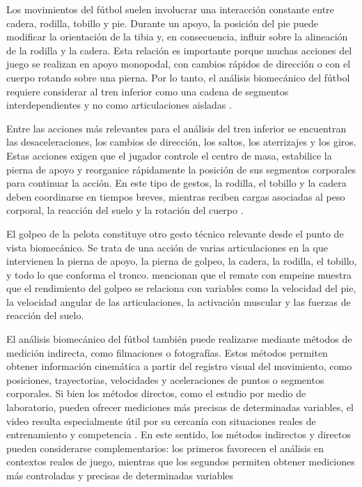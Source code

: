 Los movimientos del fútbol suelen involucrar una interacción constante entre cadera, rodilla,
tobillo y pie. Durante un apoyo, la posición del pie puede modificar la orientación de la tibia
y, en consecuencia, influir sobre la alineación de la rodilla y la cadera. Esta relación es
importante porque muchas acciones del juego se realizan en apoyo monopodal, con cambios rápidos
de dirección o con el cuerpo rotando sobre una pierna. Por lo tanto, el análisis biomecánico del
fútbol requiere considerar al tren inferior como una cadena de segmentos interdependientes y no
como articulaciones aisladas \parencite{SanchezHernandezEtAl2016}.

Entre las acciones más relevantes para el análisis del tren inferior se encuentran las
desaceleraciones, los cambios de dirección, los saltos, los aterrizajes y los giros. Estas
acciones exigen que el jugador controle el centro de masa, estabilice la pierna de apoyo y
reorganice rápidamente la posición de sus segmentos corporales para continuar la acción. En
este tipo de gestos, la rodilla, el tobillo y la cadera deben coordinarse en tiempos breves,
mientras reciben cargas asociadas al peso corporal, la reacción del suelo y la rotación del
cuerpo \parencite{PlakiasEtAl2024}.

El golpeo de la pelota constituye otro gesto técnico relevante desde el punto de vista
biomecánico. Se trata de una acción de varias articulaciones en la que intervienen la pierna de
apoyo, la pierna de golpeo, la cadera, la rodilla, el tobillo, y todo lo que conforma el tronco.
\textcite{ManolopoulosEtAl2013} mencionan que el remate con empeine muestra que el rendimiento
del golpeo se relaciona con variables como la velocidad del pie, la velocidad angular de las
articulaciones, la activación muscular y las fuerzas de reacción del suelo.

El análisis biomecánico del fútbol también puede realizarse mediante métodos de medición
indirecta, como filmaciones o fotografías. Estos métodos permiten obtener información cinemática
a partir del registro visual del movimiento, como posiciones, trayectorias, velocidades y
aceleraciones de puntos o segmentos corporales. Si bien los métodos directos, como el estudio
por medio de laboratorio, pueden ofrecer mediciones más precisas de determinadas variables, el
video resulta especialmente útil por su cercanía con situaciones reales de entrenamiento y
competencia \parencite{CossioBolanosArruda2009}. En este sentido, los métodos indirectos y directos 
pueden considerarse complementarios: los primeros favorecen el análisis en contextos reales de juego, 
mientras que los segundos permiten obtener mediciones más controladas y precisas de determinadas variables


